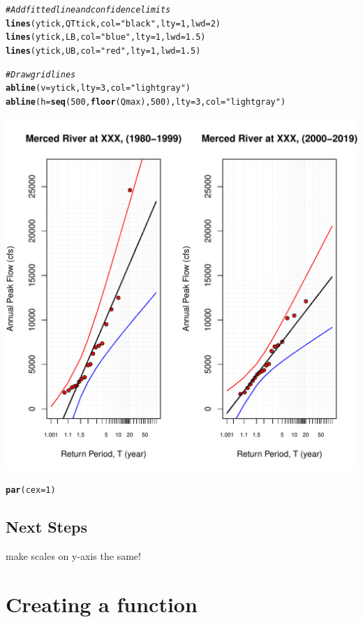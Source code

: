 \documentclass{article}\usepackage[]{graphicx}\usepackage[]{color}
\makeatletter
\def\maxwidth{ %
  \ifdim\Gin@nat@width>\linewidth
    \linewidth
  \else
    \Gin@nat@width
  \fi
}
\newcommand{\hlnum}[1]{\textcolor[rgb]{0.686,0.059,0.569}{#1}}%
\newcommand{\hlstr}[1]{\textcolor[rgb]{0.192,0.494,0.8}{#1}}%
\newcommand{\hlcom}[1]{\textcolor[rgb]{0.678,0.584,0.686}{\textit{#1}}}%
\newcommand{\hlstd}[1]{\textcolor[rgb]{0.345,0.345,0.345}{#1}}%
\newcommand{\hlkwc}[1]{\textcolor[rgb]{0.333,0.667,0.333}{#1}}%
\newcommand{\hlkwd}[1]{\textcolor[rgb]{0.737,0.353,0.396}{\textbf{#1}}}%
\newenvironment{kframe}{%
 \def\at@end@of@kframe{}%
 \ifinner\ifhmode%
  \def\at@end@of@kframe{\end{minipage}}%
  \begin{minipage}{\columnwidth}%
 \fi\fi%
 \def\FrameCommand##1{\hskip\@totalleftmargin \hskip-\fboxsep
 \colorbox{shadecolor}{##1}\hskip-\fboxsep
     \hskip-\linewidth \hskip-\@totalleftmargin \hskip\columnwidth}%
 \MakeFramed {\advance\hsize-\width
   \@totalleftmargin\z@ \linewidth\hsize
   \@setminipage}}%
 {\par\unskip\endMakeFramed%
 \at@end@of@kframe}
\newenvironment{knitrout}{}{} %
\makeatother
\begin{document}
\begin{knitrout}
\begin{kframe}
\begin{alltt}
\hlcom{# Add fitted line and confidence limits}
\hlkwd{lines}\hlstd{(ytick, QTtick,} \hlkwc{col} \hlstd{=} \hlstr{"black"}\hlstd{,} \hlkwc{lty}\hlstd{=}\hlnum{1}\hlstd{,} \hlkwc{lwd}\hlstd{=}\hlnum{2}\hlstd{)}
\hlkwd{lines}\hlstd{(ytick, LB,} \hlkwc{col} \hlstd{=} \hlstr{"blue"}\hlstd{,} \hlkwc{lty} \hlstd{=} \hlnum{1}\hlstd{,} \hlkwc{lwd}\hlstd{=}\hlnum{1.5}\hlstd{)}
\hlkwd{lines}\hlstd{(ytick, UB,} \hlkwc{col} \hlstd{=} \hlstr{"red"}\hlstd{,} \hlkwc{lty} \hlstd{=} \hlnum{1}\hlstd{,} \hlkwc{lwd}\hlstd{=}\hlnum{1.5}\hlstd{)}

\hlcom{# Draw grid lines}
\hlkwd{abline}\hlstd{(}\hlkwc{v} \hlstd{= ytick,} \hlkwc{lty} \hlstd{=} \hlnum{3}\hlstd{,} \hlkwc{col}\hlstd{=}\hlstr{"light gray"}\hlstd{)}
\hlkwd{abline}\hlstd{(}\hlkwc{h} \hlstd{=} \hlkwd{seq}\hlstd{(}\hlnum{500}\hlstd{,} \hlkwd{floor}\hlstd{(Qmax),} \hlnum{500}\hlstd{),} \hlkwc{lty} \hlstd{=} \hlnum{3}\hlstd{,}\hlkwc{col}\hlstd{=}\hlstr{"light gray"}\hlstd{)}
\end{alltt}
\end{kframe}
\includegraphics[width=\maxwidth]{figure/unnamed-chunk-7-1} 
\begin{kframe}\begin{alltt}
\hlkwd{par}\hlstd{(}\hlkwc{cex} \hlstd{=} \hlnum{1}\hlstd{)}
\end{alltt}
\end{kframe}
\end{knitrout}

\subsection{Next Steps}

make scales on y-axis the same!

\section{Creating a function}
\end{document}
